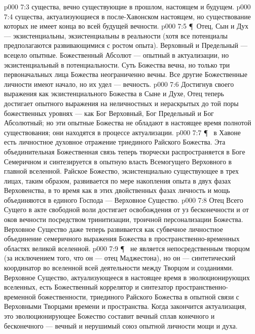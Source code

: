 \vs p000 7:3 \bibnobreakspace {} существа, вечно существующие в прошлом, настоящем и будущем.
\vs p000 7:4 \bibnobreakspace {} существа, актуализующиеся в после\hyp{}Хавонском настоящем, но существование которых не имеет конца во всей будущей вечности.
\vs p000 7:5 \P\ Отец, Сын и Дух --- экзистенциальны, экзистенциальны в реальности (хотя все потенциалы предполагаются развивающимися с ростом опыта). Верховный и Предельный --- всецело опытные. Божественный Абсолют --- опытный в актуализации, но экзистенциальный в потенциальности. Суть Божества вечна, но только три первоначальных лица Божества неограниченно вечны. Все другие Божественные личности имеют начало, но их удел --- вечность.
\vs p000 7:6 Достигнув своего выражения как экзистенциального Божества в Сыне и Духе, Отец теперь достигает опытного выражения на неличностных и нераскрытых до той поры божественных уровнях --- как Бог Верховный, Бог Предельный и Бог Абсолютный; но эти опытные Божества не обладают в настоящее время полнотой существования; они находятся в процессе актуализации.
\vs p000 7:7 \P\  в Хавоне есть личностное духовное отражение триединого Райского Божества. Эта объединительная Божественная связь теперь творчески распространяется в Боге Семеричном и синтезируется в опытную власть Всемогущего Верховного в главной вселенной. Райское Божество, экзистенциально существующее в трех лицах, таким образом, развивается по мере накопления опыта в двух фазах Верховенства, в то время как в этих двойственных фазах личность и мощь объединяются в единого Господа --- Верховное Существо.
\vs p000 7:8 Отец Всего Сущего в акте свободной воли достигает освобождения от уз бесконечности и от оков вечности посредством тринитизации, троичной персонализации Божества. Верховное Существо даже теперь развивается как субвечное личностное объединение семеричного выражения Божества в пространственно\hyp{}временных областях великой вселенной.
\vs p000 7:9 \P\  не является непосредственным творцом (за исключением того, что он --- отец Маджестона), но он --- синтетический координатор во вселенной всей деятельности между Творцом и созданиями. Верховное Существо, актуализующееся в настоящее время в эволюционирующих вселенных, есть Божественный коррелятор и синтезатор пространственно\hyp{}временной божественности, триединого Райского Божества в опытной связи с Верховными Творцами времени и пространства. Когда закончится актуализация, это эволюционирующее Божество составит вечный сплав конечного и бесконечного --- вечный и нерушимый союз опытной личности мощи и духа.
